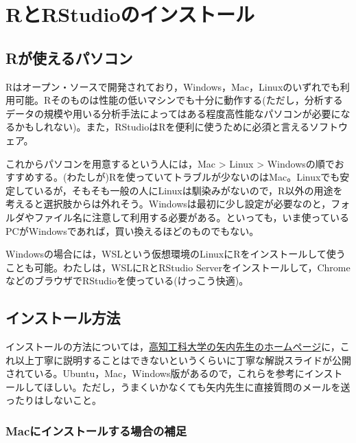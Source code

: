 \documentclass[
]{book}
\begin{document}
\hypertarget{rux3068rstudioux306eux30a4ux30f3ux30b9ux30c8ux30fcux30eb}{%
\chapter{RとRStudioのインストール}\label{rux3068rstudioux306eux30a4ux30f3ux30b9ux30c8ux30fcux30eb}}

\hypertarget{rux304cux4f7fux3048ux308bux30d1ux30bdux30b3ux30f3}{%
\section{Rが使えるパソコン}\label{rux304cux4f7fux3048ux308bux30d1ux30bdux30b3ux30f3}}

Rはオープン・ソースで開発されており，Windows，Mac，Linuxのいずれでも利用可能。Rそのものは性能の低いマシンでも十分に動作する(ただし，分析するデータの規模や用いる分析手法によってはある程度高性能なパソコンが必要になるかもしれない)。また，RStudioはRを便利に使うために必須と言えるソフトウェア。

これからパソコンを用意するという人には，Mac \textgreater{} Linux \textgreater{} Windowsの順でおすすめする。(わたしが)Rを使っていてトラブルが少ないのはMac。Linuxでも安定しているが，そもそも一般の人にLinuxは馴染みがないので，R以外の用途を考えると選択肢からは外れそう。Windowsは最初に少し設定が必要なのと，フォルダやファイル名に注意して利用する必要がある。といっても，いま使っているPCがWindowsであれば，買い換えるほどのものでもない。

Windowsの場合には，WSLという仮想環境のLinuxにRをインストールして使うことも可能。わたしは，WSLにRとRStudio Serverをインストールして，ChromeなどのブラウザでRStudioを使っている(けっこう快適)。

\hypertarget{ux30a4ux30f3ux30b9ux30c8ux30fcux30ebux65b9ux6cd5}{%
\section{インストール方法}\label{ux30a4ux30f3ux30b9ux30c8ux30fcux30ebux65b9ux6cd5}}

インストールの方法については，\href{https://yukiyanai.github.io/jp/resources/}{高知工科大学の矢内先生のホームページ}に，これ以上丁寧に説明することはできないというくらいに丁寧な解説スライドが公開されている。Ubuntu，Mac，Windows版があるので，これらを参考にインストールしてほしい。ただし，うまくいかなくても矢内先生に直接質問のメールを送ったりはしないこと。

\hypertarget{macux306bux30a4ux30f3ux30b9ux30c8ux30fcux30ebux3059ux308bux5834ux5408ux306eux88dcux8db3}{%
\subsection{Macにインストールする場合の補足}\label{macux306bux30a4ux30f3ux30b9ux30c8ux30fcux30ebux3059ux308bux5834ux5408ux306eux88dcux8db3}}
\end{document}
